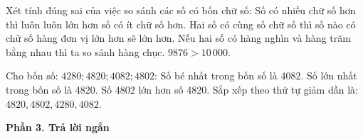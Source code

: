 \begin{ex} %
Xét tính đúng sai của việc so sánh các số có bốn chữ số:
\choiceTF
{\True Số có nhiều chữ số hơn thì luôn luôn lớn hơn số có ít chữ số hơn.}
{Hai số có cùng số chữ số thì số nào có chữ số hàng đơn vị lớn hơn sẽ lớn hơn.}
{\True Nếu hai số có hàng nghìn và hàng trăm bằng nhau thì ta so sánh hàng chục.}
{$9876 > 10\,000$.}
\end{ex}

\begin{ex} %
Cho bốn số: $4280; 4820; 4082; 4802$:
\choiceTF
{\True Số bé nhất trong bốn số là 4082.}
{\True Số lớn nhất trong bốn số là 4820.}
{Số 4802 lớn hơn số 4820.}
{\True Sắp xếp theo thứ tự giảm dần là: $4820, 4802, 4280, 4082$.}
\end{ex}

\textbf{Phần 3. Trả lời ngắn}

